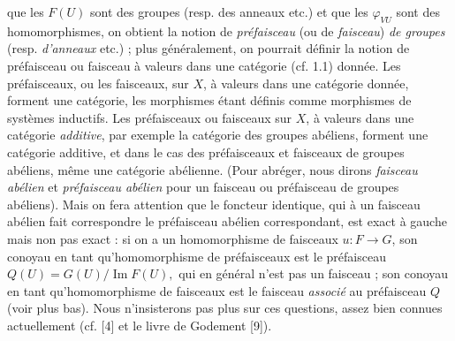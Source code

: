 
\noindent que les $F(U)$ sont des groupes (resp. des anneaux etc.) et que les
$\varphi_{VU}$ sont des homomorphismes, on obtient la notion de \textit{préfaisceau}
(ou de \textit{faisceau}) \textit{de groupes} (resp. \textit{d'anneaux} etc.) ; plus généralement, on
pourrait définir la notion de préfaisceau ou faisceau à valeurs dans une
catégorie (cf. 1.1) donnée. Les préfaisceaux, ou les faisceaux, sur $X$, à
valeurs dans une catégorie donnée, forment une catégorie, les morphismes étant
définis comme morphismes de systèmes inductifs. Les préfaisceaux ou faisceaux
sur $X$, à valeurs dans une catégorie \textit{additive}, par exemple la
catégorie des groupes abéliens, forment une catégorie additive, et dans le cas
des préfaisceaux et faisceaux de groupes abéliens, même une catégorie
abélienne. (Pour abréger, nous dirons \textit{faisceau abélien} et
\textit{préfaisceau abélien} pour un faisceau ou préfaisceau de groupes
abéliens).
Mais on fera attention que le foncteur identique, qui à un faisceau abélien
fait correspondre le préfaisceau abélien correspondant, est exact à gauche
mais non pas exact : si on a un homomorphisme de faisceaux
$u:F\to G$, son conoyau en tant qu'homomorphisme de préfaisceaux
est le préfaisceau
$Q(U)=G(U)/\operatorname{Im}F(U),$
qui en général n'est pas un faisceau ; son conoyau en tant qu'homomorphisme de
faisceaux est le faisceau \textit{associé} au préfaisceau $Q$ (voir plus bas).
Nous n'insisterons pas plus sur ces questions, assez bien connues actuellement
(cf. [4] et le livre de Godement [9]).

